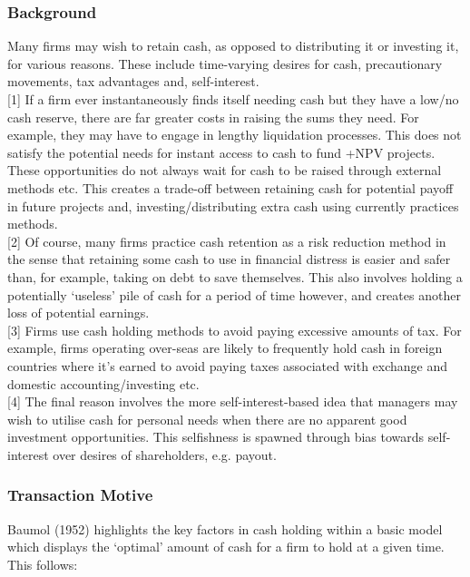\documentclass[11pt, english]{article}
\begin{document}
		\subsubsection*{Background}

	Many firms may wish to retain cash, as opposed to distributing it or investing it, for various reasons. These include time-varying desires for cash, precautionary movements, tax advantages and, self-interest.\\

	[1] If a firm ever instantaneously finds itself needing cash but they have a low/no cash reserve, there are far greater costs in raising the sums they need. For example, they may have to engage in lengthy liquidation processes. This does not satisfy the potential needs for instant access to cash to fund +NPV projects. These opportunities do not always wait for cash to be raised through external methods etc. This creates a trade-off between retaining cash for potential payoff in future projects and, investing/distributing extra cash using currently practices methods.\\

	[2] Of course, many firms practice cash retention as a risk reduction method in the sense that retaining some cash to use in financial distress is easier and safer than, for example, taking on debt to save themselves. This also involves holding a potentially ‘useless’ pile of cash for a period of time however, and creates another loss of potential earnings.\\

	[3] Firms use cash holding methods to avoid paying excessive amounts of tax. For example, firms operating over-seas are likely to frequently hold cash in foreign countries where it’s earned to avoid paying taxes associated with exchange and domestic accounting/investing etc.\\

	[4] The final reason involves the more self-interest-based idea that managers may wish to utilise cash for personal needs when there are no apparent good investment opportunities. This selfishness is spawned through bias towards self-interest over desires of shareholders, e.g. payout.

		\subsubsection*{Transaction Motive}

	Baumol (1952) highlights the key factors in cash holding within a basic model which displays the ‘optimal’ amount of cash for a firm to hold at a given time. This follows:
\end{document}

